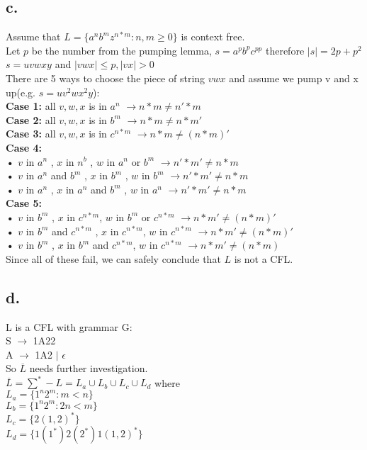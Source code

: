 \documentclass[12pt]{article}
\begin{document}
\subsection*{c.}
Assume that $L=\lbrace a^nb^mz^{n*m}: n,m\geq 0 \rbrace $ is context free. \\
Let $p$ be the number from the pumping lemma, $s=a^p b^p c^{pp}$ therefore $|s| = 2p+p^2$\\
$s=uvwxy$ and $|vwx|\leq p , |vx|>0 $\\
There are 5 ways to choose the piece of string $vwx$ and assume we pump v and x up(e.g. $s=uv^2wx^2y$):\\
\textbf{Case 1:} all $v,w,x$ is in $a^n$ $\rightarrow {n*m} \neq n'*m $\\
\textbf{Case 2:} all $v,w,x$ is in $b^m$ $\rightarrow {n*m} \neq n*m' $\\
\textbf{Case 3:} all $v,w,x$ is in $c^{n*m}$ $\rightarrow {n*m} \neq (n*m)' $\\
\textbf{Case 4:}\\
\indent \textbf{•} $v$ in $a^n$ , $x$ in $n^b$ , $w$ in $a^n$ or $b^m$ $\rightarrow n'*m' \neq n*m $\\
\indent \textbf{•} $v$ in $a^n$ and $b^m$ , $x$ in $b^m$ , $w$ in $b^m $ $\rightarrow n'*m' \neq n*m $\\
\indent \textbf{•} $v$ in $a^n$ , $x$ in $a^n$ and $b^m$ , $w$ in $a^n  $ $\rightarrow n'*m' \neq n*m $\\
\textbf{Case 5:}\\
\indent \textbf{•} $v$ in $b^m$ , $x$ in $c^{n*m}$, $w$ in $b^m $ or $c^{n*m}$ $\rightarrow n*m' \neq (n*m)' $\\
\indent \textbf{•} $v$ in $b^m$ and $c^{n*m}$ , $x$ in $c^{n*m}$, $w$ in $c^{n*m}$ $\rightarrow n*m' \neq (n*m)' $\\
\indent \textbf{•} $v$ in $b^m$ , $x$ in $b^m$ and $c^{n*m}$, $w$ in $c^{n*m}$ $\rightarrow n*m' \neq (n*m) $\\
Since all of these fail, we can safely conclude that $L$ is not a CFL.
\subsection*{d.}
L is a CFL with grammar G:\\
S $\rightarrow$ 1A22\\
A $\rightarrow$ 1A2 $|$ $ \epsilon$\\
So $\overline{L}$ needs further investigation.\\
$\overline{L} = \sum^* - L = L_a \cup L_b \cup L_c \cup L_d$ where \\
$L_a= \lbrace 1^n 2^m : m < n \rbrace$\\
$L_b= \lbrace 1^n 2^m : 2n<m \rbrace$\\
$L_c= \lbrace 2(1,2)^* \rbrace $\\
$L_d= \lbrace 1(1^*) 2(2^*)1(1,2)^* \rbrace $
\end{document}
